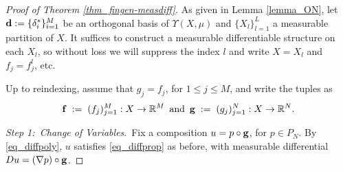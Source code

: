 \documentclass[reqno]{amsart}
\theoremstyle{plain}
\theoremstyle{definition}
\theoremstyle{remark}
\numberwithin{equation}{section}
\renewcommand{\d}{\delta}
\newcommand{\R}{\mathbb{R}}
\newcommand{\U}{\Upsilon}
\begin{document}
\begin{proof}[Proof of Theorem \ref{thm_fingen-measdiff}]
As given in Lemma \ref{lemma_ON}, let ${\bf d} := \{\d_i^*\}_{i=1}^M$ be an orthogonal basis of $\U(X,\mu)$ and $\{X_l\}_{l=1}^L$ a measurable partition of $X$.  It suffices to construct a measurable differentiable structure on each $X_l$, so without loss we will suppress the index $l$ and write $X = X_l$ and $f_j = f^l_j$, etc.

Up to reindexing, assume that $g_j = f_j$, for $1 \leq j \leq M$, and write the tuples as 
$$
{\bf f} \;:=\; (f_j)_{j=1}^M : X \to \R^M \, \text{ and } \, 
{\bf g} \;:=\; (g_j)_{j=1}^N : X \to \R^N.
$$

{\em Step 1:\ Change of Variables}.\ Fix a composition $u = p \circ {\bf g}$, for $p \in P_N$.  By \eqref{eq_diffpoly}, $u$ satisfies \eqref{eq_diffprop} as before, with measurable differential $Du = (\nabla p) \circ {\bf g}$.


\end{proof}
\end{document}
